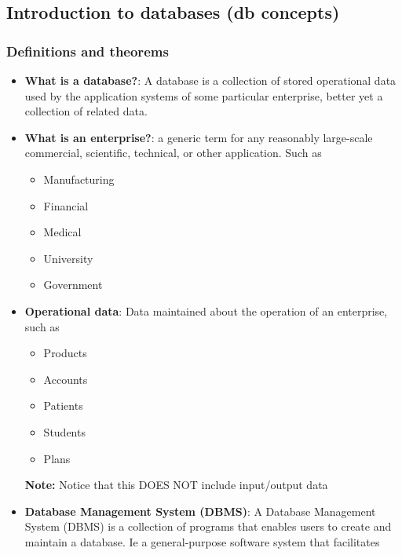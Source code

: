 \documentclass{report}
\begin{document}
\begin{itemize}
\begin{itemize}
            \end{itemize}
   \end{itemize}


    \pagebreak 

    \bigbreak \noindent 
    \subsection{Introduction to databases (db concepts)}
    \bigbreak \noindent 
    \subsubsection{Definitions and theorems}
    \begin{itemize}
        \item \textbf{What is a database?}: A database is a collection of stored operational data used by the application systems of some particular enterprise, better yet a collection of related data.
        \item \textbf{What is an enterprise?}: a generic term for any reasonably large-scale commercial, scientific, technical, or other application. Such as
            \begin{itemize}
                \item Manufacturing
                \item Financial
                \item Medical
                \item University
                \item Government
            \end{itemize}
        \item \textbf{Operational data}: Data maintained about the operation of an enterprise, such as
            \begin{itemize}
                \item Products
                \item Accounts
                \item Patients
                \item Students
                \item Plans
            \end{itemize}
            \bigbreak \noindent 
            \textbf{Note:} Notice that this DOES NOT include input/output data
        \item \textbf{Database Management System (DBMS)}: A Database Management System (DBMS) is a collection of programs that enables users to create and maintain a database. Ie a general-purpose software system that facilitates

\end{itemize}
\end{document}
